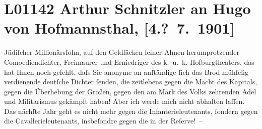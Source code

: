

\section[Arthur Schnitzler an Hugo von Hofmannsthal, {[}4.? 7. 1901{]}]{L01142 Arthur Schnitzler an Hugo von Hofmannsthal, {[}4.? 7. 1901{]}}
\nopagebreak{}
\rehead{ }\normalsize\beginnumbering{}
\toendnotes[C]{\smallbreak\pagebreak[2]}
\toendnotes[C]{\smallbreak}
\pstart
           \noindent{}{\pb}Jüdiſcher Millionärsſohn, auf den Geldſäcken ſeiner Ahnen
               herumprotzender Comoediendichter, Freimaurer und Erniedriger des k. u. k. Hofburgtheaters, das hat Ihnen noch gefehlt, daſs
               Sie anonyme \label{K_L01142-1v}\label{K_L01142-1} an anſtändige ſich das Brod mühſelig verdienende deutſche Dichter ſenden, die
               zeitlebens gegen die Macht des Kapitals, gegen die Über{\pb}hebung der Großen, gegen den am Mark des Volks zehrenden Adel und Militarismus
               gekämpft haben! Aber ich werde mich nicht abhalten laſſen. Das nächſte Jahr geht es
               nicht mehr gegen die Infanterieleutenants, ſondern gegen die Cavallerieleutenants, insbeſondre
               gegen die in der Reſerve! –\pend
           
